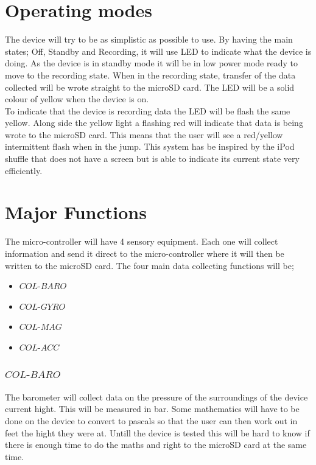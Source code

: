 \documentclass{report}
\begin{document}
\section{Operating modes}
The device will try to be as simplistic as possible to use. By having the main states; Off, Standby and Recording, it will use LED to indicate what the device is doing. As the device is in standby mode it will be in low power mode ready  to move to the recording state. When in the recording state, transfer of the data collected will be wrote straight to the microSD card. The LED will be a solid colour of yellow when the device is on. \\
To indicate that the device is recording data the LED will be flash the same yellow. Along side the yellow light a flashing red will indicate that data is being wrote to the microSD card. This means that the user will see a red/yellow intermittent flash when in the jump. This system has be inspired by the iPod shuffle that does not have a screen but is able to indicate its current state very efficiently.\\

\section{Major Functions}
The micro-controller will have 4 sensory equipment. Each one will collect information and send it direct to the micro-controller where it will then be written to the microSD card. The four main data collecting functions will be;\\

\begin{itemize}
\item $COL$-$BARO$
\item $COL$-$GYRO$
\item $COL$-$MAG$
\item $COL$-$ACC$
\end{itemize}

\subsubsection{$COL$-$BARO$}
The barometer will collect data on the pressure of the surroundings of the device current hight. This will be measured in bar. Some mathematics will have to be done on the device to convert to pascals so that the user can then work out in feet the hight they were at. Untill the device is tested this will be hard to know if there is enough time to do the maths and right to the microSD card at the same time. \\
\end{document}
